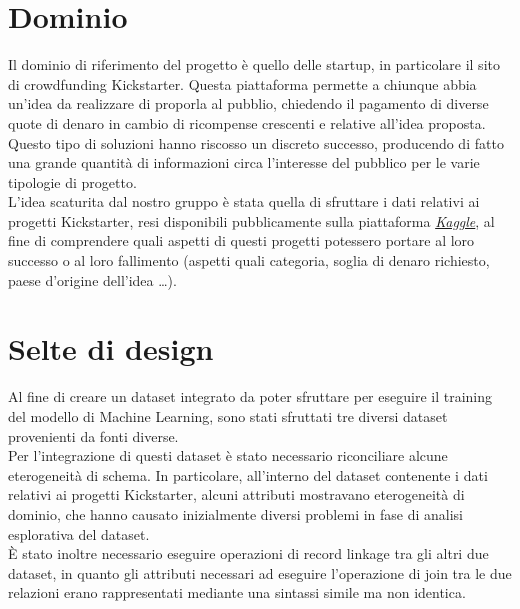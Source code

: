 \section{Dominio}
Il dominio di riferimento del progetto è quello delle startup, in particolare il sito di crowdfunding Kickstarter. Questa piattaforma permette a chiunque abbia un'idea da realizzare di proporla al pubblio, chiedendo il pagamento di diverse quote di denaro in cambio di ricompense crescenti e relative all'idea proposta.\\
Questo tipo di soluzioni hanno riscosso un discreto successo, producendo di fatto una grande quantità di informazioni circa l'interesse del pubblico per le varie tipologie di progetto.\\
L'idea scaturita dal nostro gruppo è stata quella di sfruttare i dati relativi ai progetti Kickstarter, resi disponibili pubblicamente sulla piattaforma \href{https://www.kaggle.com/}{\emph{Kaggle}}, al fine di comprendere quali aspetti di questi progetti potessero portare al loro successo o al loro fallimento (aspetti quali categoria, soglia di denaro richiesto, paese d'origine dell'idea \dots).

\section{Selte di design}
\label{sec:design}
Al fine di creare un dataset integrato da poter sfruttare per eseguire il training del modello di Machine Learning, sono stati sfruttati tre diversi dataset provenienti da fonti diverse.\\
Per l'integrazione di questi dataset è stato necessario riconciliare alcune eterogeneità di schema. In particolare, all'interno del dataset contenente i dati relativi ai progetti Kickstarter, alcuni attributi mostravano eterogeneità di dominio, che hanno causato inizialmente diversi problemi in fase di analisi esplorativa del dataset.\\
È stato inoltre necessario eseguire operazioni di record linkage tra gli altri due dataset, in quanto gli attributi necessari ad eseguire l'operazione di join tra le due relazioni erano rappresentati mediante una sintassi simile ma non identica.